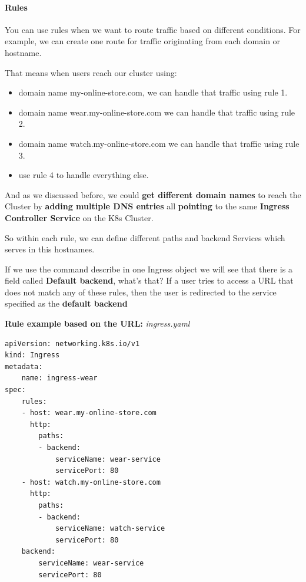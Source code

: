 \documentclass{article}
\newenvironment{blocktemplate}[1]{%
    \tcolorbox[beamer,%
    noparskip,breakable,
    colframe=Blue,%
    colbacklower=LimeGreen!75!LightGreen,%
    title=#1]}%
    {\endtcolorbox}
\newenvironment{codetemplate}[1][]{%
  \mybasecolorbox[#1]
  \itshape
}{%
  \endmybasecolorbox
}
\begin{document}
\paragraph{Rules}

You can use rules when we want to route traffic based on different conditions. For example, we can create one route for traffic originating from each domain or hostname. 

That means when users reach our cluster using:

\begin{itemize}
    \item domain name my-online-store.com, we can handle that traffic using rule 1.
    \item domain name wear.my-online-store.com we can handle that traffic using rule 2.
    \item domain name watch.my-online-store.com we can handle that traffic using rule 3.
    \item use rule 4 to handle everything else.
\end{itemize}

And as we discussed before, we could\textbf{ get different domain names} to reach the Cluster by \textbf{adding multiple DNS entries} all \textbf{pointing} to the same \textbf{Ingress Controller Service} on the K8s Cluster.

So within each rule, we can define different paths and backend Services which serves in this hostnames.

\begin{blocktemplate}{NOTE}
If we use the command describe in one Ingress object we will see that there is a field called \textbf{Default backend}, what's that? If a user tries to access a URL that does not match any of these rules, then the user is redirected to the service specified as the \textbf{default backend}
\end{blocktemplate}

\textbf{Rule example based on the URL:}
\begin{codetemplate}{ingress.yaml}
\begin{verbatim}
apiVersion: networking.k8s.io/v1
kind: Ingress
metadata:
    name: ingress-wear
spec:
    rules:
    - host: wear.my-online-store.com
      http:
        paths:
        - backend:
            serviceName: wear-service
            servicePort: 80
    - host: watch.my-online-store.com
      http: 
        paths:
        - backend:
            serviceName: watch-service
            servicePort: 80
    backend:
        serviceName: wear-service
        servicePort: 80
\end{verbatim}
\end{codetemplate}
\end{document}
